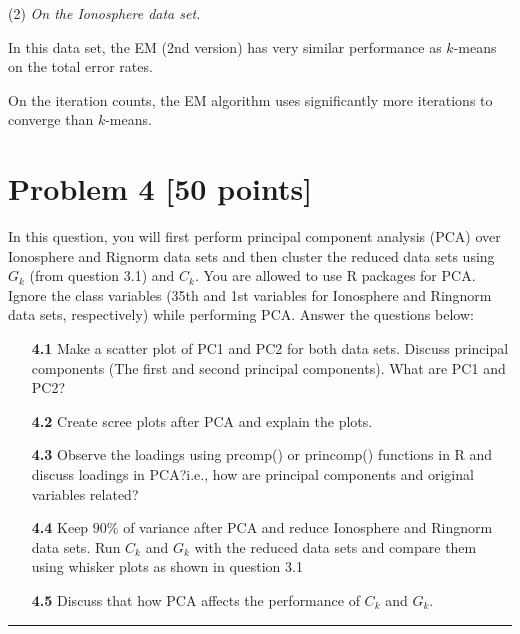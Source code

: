 \documentclass[a4paper,12pt]{article}
\newcommand{\sep}{\begin{center}\textcolor{gray}{\rule{\textwidth}{0.75pt}}\end{center}}
\begin{document}
\noindent 
(2) \emph{On the Ionosphere data set.}

In this data set, the EM (2nd version) has very similar performance as $k$-means on the total error rates.

On the iteration counts, the EM algorithm uses significantly more iterations to converge than $k$-means. 
\bigskip\bigskip


















 
 



\newpage 
\section*{Problem 4 [50 points]}  
  
In this question, you will first perform principal component analysis (PCA) over Ionosphere and Rignorm data sets and then cluster the  reduced data sets using $G_k$ (from question 3.1) and $C_k$. You are allowed to use R packages for PCA.
Ignore the class variables (35th and 1st variables for Ionosphere  and Ringnorm data sets, respectively) while performing PCA. Answer the questions below:
 \\
  \begin{enumerate}
  \item[\textbf{4.1}]  Make a scatter plot of PC1 and PC2  for both data sets. Discuss principal
components (The first and  second principal components). What are PC1 and PC2?
\\

  \item[\textbf{4.2}]  Create scree plots after PCA and explain the plots.
\\

  \item[\textbf{4.3}]  Observe the loadings using prcomp() or princomp() functions in R and  discuss loadings in PCA?i.e., how are principal components and original variables related?
\\


  \item[\textbf{4.4}]  Keep $90\%$ of variance  after PCA and reduce Ionosphere and Ringnorm data sets.  Run $C_k$ and $G_k$ with the reduced data sets and compare them using whisker plots as shown in question 3.1
 \\
 
  \item[\textbf{4.5}] Discuss that how PCA affects the performance of $C_k$ and $G_k$.  
\end{enumerate}
\sep 
\end{document}
